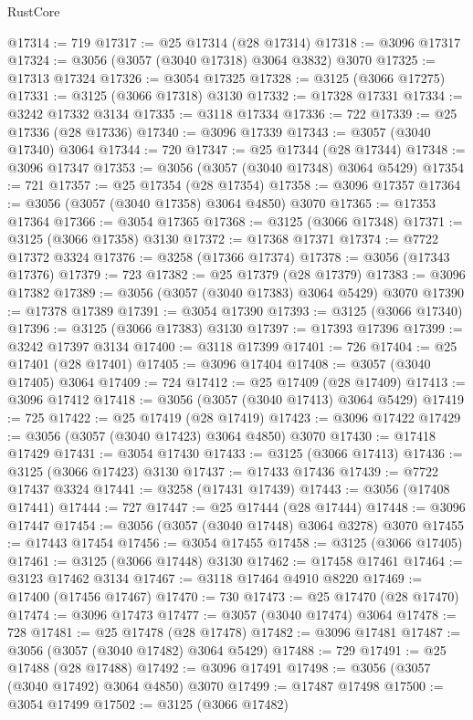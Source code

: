 \begin{lexlean}{RustCore}
\begin{coremodule}
@17314 := 719
@17317 := @25 @17314 (@28 @17314)
@17318 := @3096 @17317
@17324 := @3056 (@3057 (@3040 @17318) @3064 @3832) @3070
@17325 := @17313 @17324
@17326 := @3054 @17325
@17328 := @3125 (@3066 @17275)
@17331 := @3125 (@3066 @17318) @3130
@17332 := @17328 @17331
@17334 := @3242 @17332 @3134
@17335 := @3118 @17334
@17336 := 722
@17339 := @25 @17336 (@28 @17336)
@17340 := @3096 @17339
@17343 := @3057 (@3040 @17340) @3064
@17344 := 720
@17347 := @25 @17344 (@28 @17344)
@17348 := @3096 @17347
@17353 := @3056 (@3057 (@3040 @17348) @3064 @5429)
@17354 := 721
@17357 := @25 @17354 (@28 @17354)
@17358 := @3096 @17357
@17364 := @3056 (@3057 (@3040 @17358) @3064 @4850) @3070
@17365 := @17353 @17364
@17366 := @3054 @17365
@17368 := @3125 (@3066 @17348)
@17371 := @3125 (@3066 @17358) @3130
@17372 := @17368 @17371
@17374 := @7722 @17372 @3324
@17376 := @3258 (@17366 @17374)
@17378 := @3056 (@17343 @17376)
@17379 := 723
@17382 := @25 @17379 (@28 @17379)
@17383 := @3096 @17382
@17389 := @3056 (@3057 (@3040 @17383) @3064 @5429) @3070
@17390 := @17378 @17389
@17391 := @3054 @17390
@17393 := @3125 (@3066 @17340)
@17396 := @3125 (@3066 @17383) @3130
@17397 := @17393 @17396
@17399 := @3242 @17397 @3134
@17400 := @3118 @17399
@17401 := 726
@17404 := @25 @17401 (@28 @17401)
@17405 := @3096 @17404
@17408 := @3057 (@3040 @17405) @3064
@17409 := 724
@17412 := @25 @17409 (@28 @17409)
@17413 := @3096 @17412
@17418 := @3056 (@3057 (@3040 @17413) @3064 @5429)
@17419 := 725
@17422 := @25 @17419 (@28 @17419)
@17423 := @3096 @17422
@17429 := @3056 (@3057 (@3040 @17423) @3064 @4850) @3070
@17430 := @17418 @17429
@17431 := @3054 @17430
@17433 := @3125 (@3066 @17413)
@17436 := @3125 (@3066 @17423) @3130
@17437 := @17433 @17436
@17439 := @7722 @17437 @3324
@17441 := @3258 (@17431 @17439)
@17443 := @3056 (@17408 @17441)
@17444 := 727
@17447 := @25 @17444 (@28 @17444)
@17448 := @3096 @17447
@17454 := @3056 (@3057 (@3040 @17448) @3064 @3278) @3070
@17455 := @17443 @17454
@17456 := @3054 @17455
@17458 := @3125 (@3066 @17405)
@17461 := @3125 (@3066 @17448) @3130
@17462 := @17458 @17461
@17464 := @3123 @17462 @3134
@17467 := @3118 @17464 @4910 @8220
@17469 := @17400 (@17456 @17467)
@17470 := 730
@17473 := @25 @17470 (@28 @17470)
@17474 := @3096 @17473
@17477 := @3057 (@3040 @17474) @3064
@17478 := 728
@17481 := @25 @17478 (@28 @17478)
@17482 := @3096 @17481
@17487 := @3056 (@3057 (@3040 @17482) @3064 @5429)
@17488 := 729
@17491 := @25 @17488 (@28 @17488)
@17492 := @3096 @17491
@17498 := @3056 (@3057 (@3040 @17492) @3064 @4850) @3070
@17499 := @17487 @17498
@17500 := @3054 @17499
@17502 := @3125 (@3066 @17482)

\end{coremodule}
\end{lexlean}
